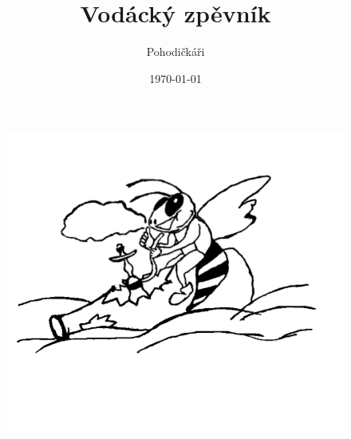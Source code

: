 \documentclass[11pt]{article}
\title{Vodácký zpěvník}
\author{Pohodičkáři}
\date{\today}
\newcounter{sloka}
\newcommand{\vloz}[1]{ \setcounter{sloka}{2}}
\begin{document}
\maketitle

\begin{figure}[htbp]
  \centering
  \includegraphics[width=16cm]{img/main_img2.png}
\end{figure}

\newpage

\begin{multicols}{2}
\tableofcontents %
\newpage %
\end{multicols}

\printindex[author] %



\newpage

\vloz{songs/1970}
\vloz{songs/1Signalni}
\vloz{songs/Amerika}
\vloz{songs/Andel}
\vloz{songs/Batalion}
\vloz{songs/BednaOdWhisky}
\vloz{songs/BlaznovaUkolebavka}
\vloz{songs/Buraky}
\vloz{songs/CerniAndele}
\vloz{songs/Cesta}
\vloz{songs/Davno}
\vloz{songs/DivokyKone}
\vloz{songs/DlouhejKour}
\vloz{songs/DobrakOdKosti}
\vloz{songs/DrobnaParalela}
\vloz{songs/FrankyDlouhan}
\vloz{songs/HejCloveceBozi}
\vloz{songs/HlidacKrav}
\vloz{songs/HolubiDum}
\vloz{songs/JahodyMrazeny}
\vloz{songs/KdyzMeBraliZaVojaka}
\vloz{songs/KdyzNasTataHral}
\vloz{songs/Kometa}
\vloz{songs/Kozel}
\vloz{songs/NahrobniKamen}
\vloz{songs/Okor}
\vloz{songs/Panenka}
\vloz{songs/PojdmeSeNapit}
\vloz{songs/RanaVTrave}
\vloz{songs/RekniKdeTyKytkyJsou}
\vloz{songs/Riptide}
\vloz{songs/SeverniVitr}
\vloz{songs/SlaviciZMadridu}
\vloz{songs/SlzyTvyMamy}
\vloz{songs/StaraArcha}
\vloz{songs/TisicMil}
\vloz{songs/TrajdaCopata}
\vloz{songs/TriKrize}
\vloz{songs/VedMeDalCestoMa}
\vloz{songs/WishYouWereHere}
\vloz{songs/Zafukane}
\vloz{songs/ZahradaTicha}
\vloz{songs/Zatanci}
\vloz{songs/ZatracenejZivot}
\vloz{songs/Zelva}
\vloz{songs/Zuzana}

\vloz{songs/VltavaTOUR}
\vloz{songs/OhreTOUR}
\end{document}
